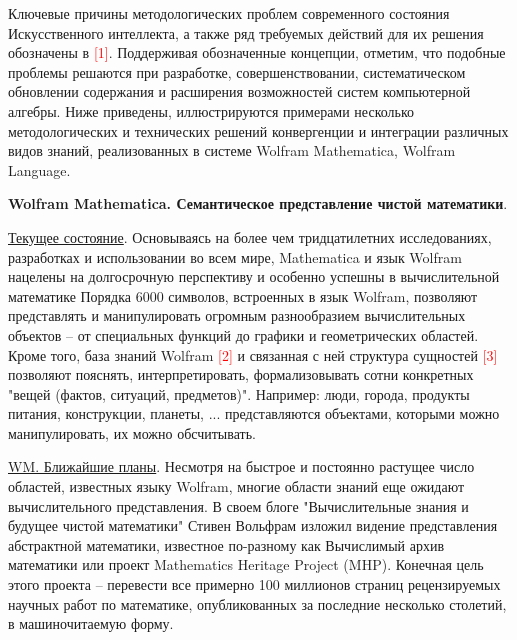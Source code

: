 Ключевые причины методологических проблем современного состояния Искусственного интеллекта, а также ряд требуемых действий для их решения обозначены в \textcolor{red}{[1]}. 
Поддерживая обозначенные концепции, отметим, что подобные проблемы решаются при разработке, совершенствовании, систематическом обновлении содержания и расширения возможностей систем компьютерной алгебры. 
Ниже приведены, иллюстрируются примерами несколько методологических и технических решений конвергенции и интеграции различных видов знаний, реализованных в системе Wolfram Mathematica, Wolfram Language.


\textbf{Wolfram Mathematica. Семантическое представление чистой математики}.

\underline{Текущее состояние}. 
Основываясь на более чем тридцатилетних исследованиях, разработках и использовании во всем мире, Mathematica и язык Wolfram нацелены на долгосрочную перспективу и особенно успешны в вычислительной математике
Порядка 6000 символов, встроенных в язык Wolfram, позволяют представлять и манипулировать огромным разнообразием вычислительных объектов – от специальных функций до графики и геометрических областей.
Кроме того, база знаний Wolfram \textcolor{red}{[2]} и связанная с ней структура сущностей \textcolor{red}{[3]} позволяют пояснять, интерпретировать, формализовывать сотни конкретных "вещей (фактов, ситуаций, предметов)". Например: люди, города, продукты питания, конструкции, планеты, ... представляются объектами, которыми можно манипулировать, их можно обсчитывать. 

\underline{WM. Ближайшие планы}. Несмотря на быстрое и постоянно растущее число областей, известных языку Wolfram, многие области знаний еще ожидают вычислительного представления. В своем блоге "Вычислительные знания и будущее чистой математики" Стивен Вольфрам изложил видение представления абстрактной математики, известное по-разному как Вычислимый архив математики или проект Mathematics Heritage Project (MHP). Конечная цель этого проекта -- перевести все примерно 100 миллионов страниц рецензируемых научных работ по математике, опубликованных за последние несколько столетий, в машиночитаемую форму.

